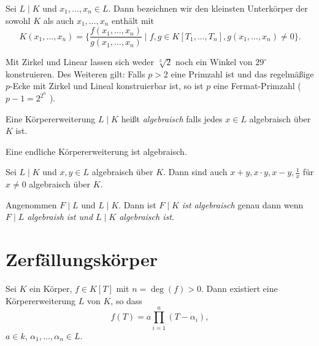 \begin{definition}
	Sei $L \mid K$ und $x_1,\ldots,x_{n} \in L$. Dann bezeichnen wir den kleinsten Unterkörper der sowohl $K$ als auch $x_1,\ldots,x_{n}$ enthält mit
	\[
		K(x_1,\ldots,x_{n}) = \{\frac{f(x_1,\ldots,x_{n})}{g(x_1,\ldots,x_{n})} \mid f,g \in K[T_1,\ldots,T_{n}], g(x_1,\ldots,x_{n}) \neq 0\} 
	.\] 
\end{definition}

\begin{corollary}[Wantzel, 1837]
	Mit Zirkel und Linear lassen sich weder $\sqrt[3]{2}$ noch ein Winkel von $29^{\circ}$ konstruieren.
	Des Weiteren gilt: Falls $p > 2$ eine Primzahl ist und das regelmäßige $p$-Ecke mit
	Zirkel und Lineal konstruierbar ist, so ist $p$ eine Fermat-Primzahl ($p-1 = 2^{2^{n}}$ ).
\end{corollary}


\begin{definition}
	Eine Körpererweiterung $L \mid K$ heißt \emph{algebraisch} falls jedes $x \in L$ algebraisch über $K$ ist.
\end{definition}

\begin{lemma}
	Eine endliche Körpererweiterung ist algebraisch.
\end{lemma}


\begin{corollary}
	Sei $L \mid K$ und $x,y \in L$ algebraisch über $K$. Dann sind auch $x+y, x\cdot y, x-y, \frac{1}{x}$ für $x\neq 0$ algebraisch über $K$.
\end{corollary}


\begin{corollary}
	Angenommen $F \mid L$ und $L \mid K$. Dann ist \emph{$F \mid K $ ist algebraisch} genau dann wenn  \emph{$F \mid L$ algebraish ist und $L \mid K$ algebraisch ist}.
\end{corollary}



\section{Zerfällungskörper}

\begin{theorem}[Kronecker]
	Sei $K$ ein Körper, $f \in K[T]$ mit $n = \deg(f) > 0$. Dann existiert eine Körpererweiterung $L$ von $K$, so dass
	\[
		f(T) = a \prod_{i=1}^{n} (T-\alpha_{i}),
	\] 
	$a \in k$, $\alpha_1,\ldots,\alpha_{n} \in L$.
\end{theorem}



